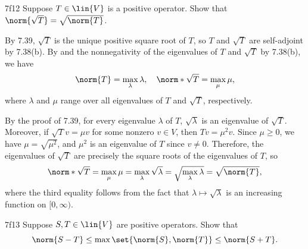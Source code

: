 \begin{exercise}{7f12}
    Suppose $T \in \lin{V}$ is a positive operator.
    Show that $\norm{\sqrt{T}} = \sqrt{\norm{T}}$.
\end{exercise}

\begin{sol}
    By 7.39, $\sqrt{T}$ is the unique positive square root of $T$, so $T$ and $\sqrt{T}$ are self-adjoint by 7.38(b).
    By  and the nonnegativity of the eigenvalues of $T$ and $\sqrt{T}$ by 7.38(b), we have 
    \[
        \norm{T} = \max_\lambda \lambda, \quad \norm*{\sqrt{T}} = \max_\mu \mu,
    \]
    where $\lambda$ and $\mu$ range over all eigenvalues of $T$ and $\sqrt{T}$, respectively.

    By the proof of 7.39, for every eigenvalue $\lambda$ of $T$, $\sqrt{\lambda}$ is an eigenvalue of $\sqrt{T}$.
    Moreover, if $\sqrt{T} v = \mu v$ for some nonzero $v \in V$, then $T v = \mu^2 v$.
    Since $\mu \geq 0$, we have $\mu = \sqrt{\mu^2}$, and $\mu^2$ is an eigenvalue of $T$ since $v \neq 0$.
    Therefore, the eigenvalues of $\sqrt{T}$ are precisely the square roots of the eigenvalues of $T$, so
    \[
        \norm*{\sqrt{T}} = \max_\mu \mu = \max_\lambda \sqrt{\lambda} = \sqrt{\max_\lambda \lambda} = \sqrt{\norm{T}},
    \]
    where the third equality follows from the fact that $\lambda \mapsto \sqrt{\lambda}$ is an increasing function on $[0, \infty)$.
\end{sol}

\begin{exercise}{7f13}
    Suppose $S, T \in \lin{V}$ are positive operators.
    Show that
    \[
        \norm{S - T} \leq \max\set{\norm{S}, \norm{T}} \leq \norm{S + T}.
    \]
\end{exercise}

